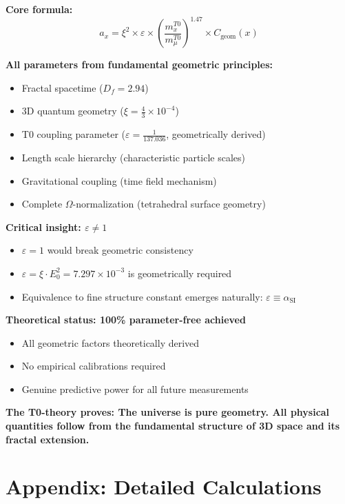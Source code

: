 \documentclass[12pt,a4paper]{article}
\numberwithin{equation}{section}
\newcommand{\xipar}{\xi}
\newcommand{\epsilonT}{\varepsilon}
\newcommand{\alphaSI}{\alpha_{\text{SI}}}
\newcommand{\Cgeom}{C_{\text{geom}}}
\newcommand{\Df}{D_f}
\newcommand{\Eo}{E_0}
\newcommand{\Omegafactor}{\Omega}
\begin{document}
	\textbf{Core formula:}
	\begin{equation}
		a_x = \xipar^2 \times \epsilonT \times \left(\frac{m_x^{T0}}{m_\mu^{T0}}\right)^{1.47} \times \Cgeom(x)
		\label{eq:core_formula}
	\end{equation}
	
	\textbf{All parameters from fundamental geometric principles:}
	\begin{itemize}
		\item Fractal spacetime ($\Df = 2.94$)
		\item 3D quantum geometry ($\xipar = \frac{4}{3} \times 10^{-4}$)
		\item T0 coupling parameter ($\epsilonT = \frac{1}{137.036}$, geometrically derived)
		\item Length scale hierarchy (characteristic particle scales)
		\item Gravitational coupling (time field mechanism)
		\item Complete $\Omegafactor$-normalization (tetrahedral surface geometry)
	\end{itemize}
	
	\textbf{Critical insight: $\epsilonT \neq 1$}
	\begin{itemize}
		\item $\epsilonT = 1$ would break geometric consistency
		\item $\epsilonT = \xipar \cdot \Eo^2 = 7.297 \times 10^{-3}$ is geometrically required
		\item Equivalence to fine structure constant emerges naturally: $\epsilonT \equiv \alphaSI$
	\end{itemize}
	
	\textbf{Theoretical status: 100\% parameter-free achieved}
	\begin{itemize}
		\item All geometric factors theoretically derived
		\item No empirical calibrations required
		\item Genuine predictive power for all future measurements
	\end{itemize}
	
	\textbf{The T0-theory proves: The universe is pure geometry. All physical quantities follow from the fundamental structure of 3D space and its fractal extension.}
	
	
	\section{Appendix: Detailed Calculations}
	
\end{document}
